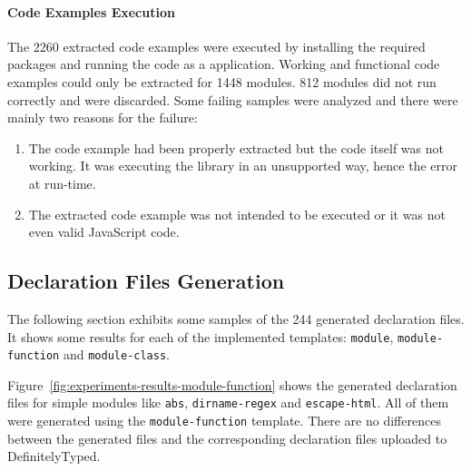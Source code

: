 \documentclass[a4paper,english,cleveref, autoref]{lipics-v2019}
\newcommand{\figref}[1]{Figure~\ref{#1}}
\begin{document}
\paragraph*{Code Examples Execution}
The 2260 extracted code examples were executed by installing the required packages and running the code as a \NodeJS{} application. Working and functional code examples could only be extracted for 1448 modules. 812 modules did not run correctly and were discarded. Some failing samples were analyzed and there were mainly two reasons for the failure:
\begin{enumerate}
	\item The code example had been properly extracted but the code itself was not working. It was executing the library in an unsupported way, hence the error at run-time.
	\item The extracted code example was not intended to be executed or it was not even valid JavaScript code.
\end{enumerate}

\subsection{Declaration Files Generation} \label{sec:experiments-declaration-files-generation}

The following section exhibits some samples of the 244 generated declaration files. It shows some results for each of the implemented templates: \lstinline{module}, \lstinline{module-function} and \lstinline{module-class}.

\figref{fig:experiments-results-module-function} shows the generated declaration files for simple modules like \texttt{abs}, \texttt{dirname-regex} and \texttt{escape-html}. All of them were generated using the \texttt{module-function} template. There are no differences between the generated files and the corresponding declaration files uploaded to DefinitelyTyped.
\end{document}
